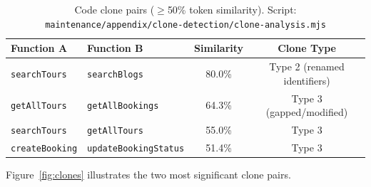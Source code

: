\documentclass[11pt,a4paper]{article}
\begin{document}
\begin{table}[H]
\centering\small
\begin{tabular}{@{}llcc@{}}
\toprule
\textbf{Function A} & \textbf{Function B} & \textbf{Similarity} & \textbf{Clone Type} \\
\midrule
\texttt{searchTours} & \texttt{searchBlogs}        & 80.0\% & Type 2 (renamed identifiers) \\
\texttt{getAllTours}  & \texttt{getAllBookings}      & 64.3\% & Type 3 (gapped/modified) \\
\texttt{searchTours} & \texttt{getAllTours}          & 55.0\% & Type 3 \\
\texttt{createBooking} & \texttt{updateBookingStatus} & 51.4\% & Type 3 \\
\bottomrule
\end{tabular}
\caption{Code clone pairs ($\geq$50\% token similarity). Script:
  \texttt{maintenance/appendix/clone-detection/clone-analysis.mjs}}
\end{table}

Figure~\ref{fig:clones} illustrates the two most significant clone pairs.
\end{document}
